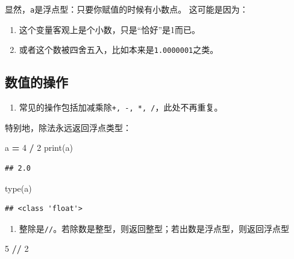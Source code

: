 \documentclass[
]{book}
\newenvironment{Shaded}{\begin{snugshade}}{\end{snugshade}}
\newcommand{\BuiltInTok}[1]{#1}
\newcommand{\DecValTok}[1]{\textcolor[rgb]{0.00,0.00,0.81}{#1}}
\newcommand{\NormalTok}[1]{#1}
\newcommand{\OperatorTok}[1]{\textcolor[rgb]{0.81,0.36,0.00}{\textbf{#1}}}
\providecommand{\tightlist}{%
  \setlength{\itemsep}{0pt}\setlength{\parskip}{0pt}}
\begin{document}
显然，\texttt{a}是浮点型：只要你赋值的时候有小数点。
这可能是因为：

\begin{enumerate}
\def\labelenumi{\arabic{enumi}.}
\tightlist
\item
  这个变量客观上是个小数，只是``恰好''是1而已。
\item
  或者这个数被四舍五入，比如本来是\texttt{1.0000001}之类。
\end{enumerate}

\hypertarget{ux6570ux503cux7684ux64cdux4f5c}{%
\subsection{数值的操作}\label{ux6570ux503cux7684ux64cdux4f5c}}

\begin{enumerate}
\def\labelenumi{\arabic{enumi}.}
\tightlist
\item
  常见的操作包括加减乘除\texttt{+,\ -,\ *,\ /}，此处不再重复。
\end{enumerate}

特别地，除法永远返回浮点类型：

\begin{Shaded}
\begin{Highlighting}[]
\NormalTok{a }\OperatorTok{=} \DecValTok{4} \OperatorTok{/} \DecValTok{2}
\BuiltInTok{print}\NormalTok{(a)}
\end{Highlighting}
\end{Shaded}

\begin{verbatim}
## 2.0
\end{verbatim}

\begin{Shaded}
\begin{Highlighting}[]
\BuiltInTok{type}\NormalTok{(a)}
\end{Highlighting}
\end{Shaded}

\begin{verbatim}
## <class 'float'>
\end{verbatim}

\begin{enumerate}
\def\labelenumi{\arabic{enumi}.}
\setcounter{enumi}{1}
\tightlist
\item
  整除是\texttt{//}。若除数是整型，则返回整型；若出数是浮点型，则返回浮点型
\end{enumerate}

\begin{Shaded}
\begin{Highlighting}[]
\DecValTok{5} \OperatorTok{//} \DecValTok{2}
\end{Highlighting}
\end{Shaded}
\end{document}
